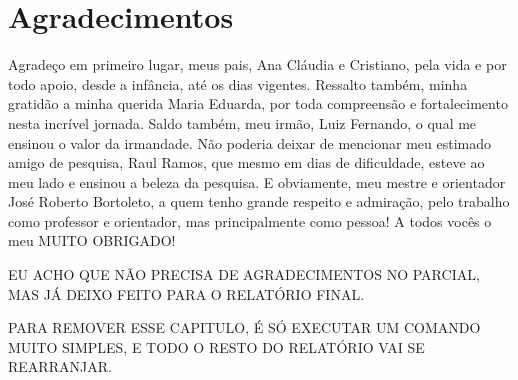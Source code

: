 
\chapter{Agradecimentos}



Agradeço em primeiro lugar, meus pais, Ana Cláudia e Cristiano, pela vida e por todo apoio, desde a infância, até os dias vigentes. Ressalto também, minha gratidão a minha querida Maria Eduarda, por toda compreensão e fortalecimento nesta incrível jornada. Saldo também, meu irmão, Luiz Fernando, o qual me ensinou o valor da irmandade. 
Não poderia deixar de mencionar meu estimado amigo de pesquisa, Raul Ramos, que mesmo em dias de dificuldade, esteve ao meu lado e ensinou a beleza da pesquisa. E obviamente, meu mestre e orientador José Roberto Bortoleto, a quem tenho grande respeito e admiração, pelo trabalho como professor e orientador, mas principalmente como pessoa!
A todos vocês o meu MUITO OBRIGADO!

\vspace{5cm}
EU ACHO QUE NÃO PRECISA DE AGRADECIMENTOS NO PARCIAL, MAS JÁ DEIXO FEITO PARA O RELATÓRIO FINAL. 

PARA REMOVER ESSE CAPITULO, É SÓ EXECUTAR UM COMANDO MUITO SIMPLES, E TODO O RESTO DO RELATÓRIO VAI SE REARRANJAR.